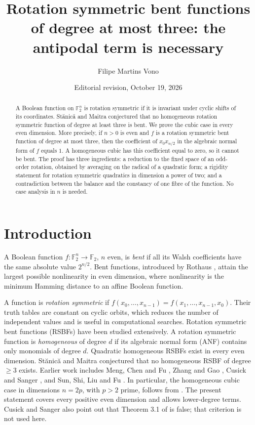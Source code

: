 \documentclass[11pt,reqno]{amsart}
\title[Antipodal necessity through degree three]{Rotation symmetric bent functions of degree at most three: the antipodal term is necessary}
\author{Filipe Martins Vono}
\date{Editorial revision, October 19, 2026}
\begin{document}
\begin{abstract}
A Boolean function on $\mathbb F_2^n$ is rotation symmetric if it is invariant under cyclic shifts of its coordinates. St\u{a}nic\u{a} and Maitra conjectured that no homogeneous rotation symmetric function of degree at least three is bent. We prove the cubic case in every even dimension. More precisely, if $n>0$ is even and $f$ is a rotation symmetric bent function of degree at most three, then the coefficient of $x_0x_{n/2}$ in the algebraic normal form of $f$ equals $1$. A homogeneous cubic has this coefficient equal to zero, so it cannot be bent. The proof has three ingredients: a reduction to the fixed space of an odd-order rotation, obtained by averaging on the radical of a quadratic form; a rigidity statement for rotation symmetric quadratics in dimension a power of two; and a contradiction between the balance and the constancy of one fibre of the function. No case analysis in $n$ is needed.
\end{abstract}
\maketitle
\section{Introduction}

A Boolean function $f:\mathbb F_2^n\to\mathbb F_2$, $n$ even, is \emph{bent} if all its Walsh coefficients have the same absolute value $2^{n/2}$. Bent functions, introduced by Rothaus \cite{ref6}, attain the largest possible nonlinearity in even dimension, where nonlinearity is the minimum Hamming distance to an affine Boolean function.

A function is \emph{rotation symmetric} if $f(x_0,\dots,x_{n-1})=f(x_1,\dots,x_{n-1},x_0)$. Their truth tables are constant on cyclic orbits, which reduces the number of independent values and is useful in computational searches. Rotation symmetric bent functions (RSBFs) have been studied extensively. A rotation symmetric function is \emph{homogeneous} of degree $d$ if its algebraic normal form (ANF) contains only monomials of degree $d$. Quadratic homogeneous RSBFs exist in every even dimension. St\u{a}nic\u{a} and Maitra \cite{ref1} conjectured that no homogeneous RSBF of degree $\ge 3$ exists. Earlier work includes Meng, Chen and Fu \cite{ref2}, Zhang and Gao \cite{ref3}, Cusick and Sanger \cite{ref4}, and Sun, Shi, Liu and Fu \cite{ref5}. In particular, the homogeneous cubic case in dimensions $n=2p$, with $p>2$ prime, follows from \cite[Theorem~3.8]{ref4}. The present statement covers every positive even dimension and allows lower-degree terms. Cusick and Sanger also point out that Theorem 3.1 of \cite{ref3} is false; that criterion is not used here.
\end{document}
